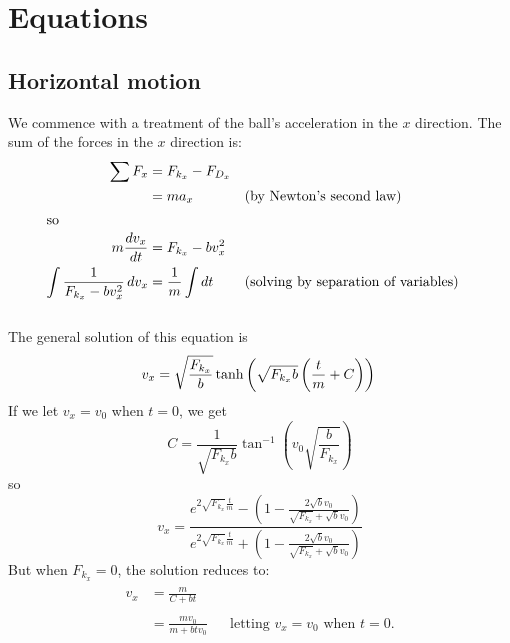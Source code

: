 \documentclass[12pt, twoside, a4paper]{article}
\begin{document}
\section{Equations}
\subsection{Horizontal motion}
We commence with a treatment of the ball's acceleration in the $x$ direction. The sum of the forces in the $x$ direction is:
\begin{align*}
\sum F_x &= F_{k_x} - F_{D_x} \\
&= ma_x && \text{(by Newton's second law)} \\
\shortintertext{so}
m \frac{dv_x}{dt} &=   F_{k_x} - bv_x^2 \\
\int \frac{1}{F_{k_x} - bv_x^2} \, dv_x &=  \frac{1}{m} \int dt && \text{(solving by separation of variables)} \\
\end{align*}
\\
The general solution of this equation is
\begin{equation*}
v_x = \sqrt{\frac{F_{k_x}}{b}} \tanh \left( \sqrt{F_{k_x} b } \left(\frac{t}{m} + C \right) \right) \\
\end{equation*}
If we let $v_x = v_0$ when $t = 0$, we get $$C = \frac{1}{\sqrt{F_{k_x} b}}\tan ^{-1} \left ( v_0 \sqrt{ \frac{b}{F_{k_x}}}\right)$$
so
\begin{equation} \label{generalx}
v_x = \frac{e^{2 \sqrt{F_{k_x}} \frac{t}{m} } - \left( 1 - \displaystyle \frac{2\sqrt{b}v_0}{\sqrt{F_{k_x}} + \sqrt{b}v_0} \right) }
{e^{2 \sqrt{F_{k_x}} \frac{t}{m} } + \left ( 1 - \displaystyle \frac{2\sqrt{b}v_0}{\sqrt{F_{k_x}} + \sqrt{b}v_0}\right) }
\end{equation}
But when $F_{k_x} = 0$, the solution reduces to:
\begin{align}\label{noforcex}
\begin{aligned}  
v_x &= \frac{m}{C + bt} \\
\\
&= \frac{m v_0}{m + btv_0} && \text{letting $v_x = v_0$ when $t = 0$.} 
\end{aligned}
\end{align}
\end{document}
